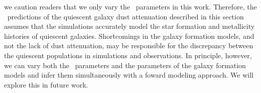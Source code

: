 we caution readers
that we only vary the \eda~parameters in this work.     
Therefore, the \eda~predictions of the quiescent galaxy dust attenuation
described in this section assumes that the simulations accurately model the
star formation and metallicity histories of quiescent galaxies. 
Shortcomings in the galaxy formation models, and not the lack of dust
attenuation, may be responsible for the discrepancy between the quiescent
populations in simulations and observations. 
In principle, however, we can vary both the \eda~parameters and the parameters
of the galaxy formation models and infer them simultaneously with a foward
modeling approach. 
We will explore this in future work. 
